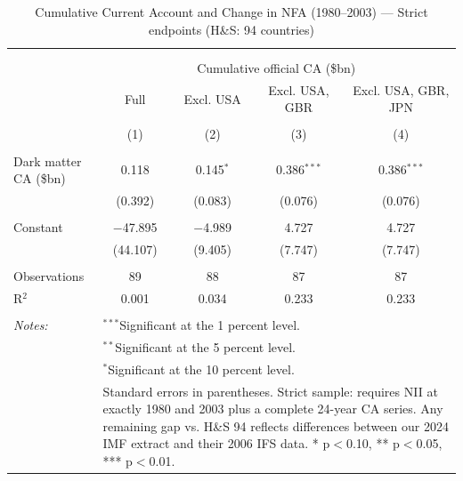 \documentclass[11pt]{article}
\begin{document}
\small
\setcounter{table}{0}

\begin{table}[!htbp] \centering 
  \caption{Cumulative Current Account and Change in NFA (1980--2003) --- Strict endpoints (H\&S: 94 countries)} 
  \label{tab:table1_corrected} 
\begin{tabular}{@{\extracolsep{5pt}}lcccc} 
\\[-1.8ex]\hline 
\hline \\[-1.8ex] 
\\[-1.8ex] & \multicolumn{4}{c}{Cumulative official CA (\$bn)} \\ 
 & Full & Excl. USA & Excl. USA, GBR & Excl. USA, GBR, JPN \\ 
\\[-1.8ex] & (1) & (2) & (3) & (4)\\ 
\hline \\[-1.8ex] 
 Dark matter CA (\$bn) & 0.118 & 0.145$^{*}$ & 0.386$^{***}$ & 0.386$^{***}$ \\ 
  & (0.392) & (0.083) & (0.076) & (0.076) \\ 
  & & & & \\ 
 Constant & $-$47.895 & $-$4.989 & 4.727 & 4.727 \\ 
  & (44.107) & (9.405) & (7.747) & (7.747) \\ 
  & & & & \\ 
Observations & 89 & 88 & 87 & 87 \\ 
R$^{2}$ & 0.001 & 0.034 & 0.233 & 0.233 \\ 
\hline \\[-1.8ex] 
\textit{Notes:} & \multicolumn{4}{l}{$^{***}$Significant at the 1 percent level.} \\ 
 & \multicolumn{4}{l}{$^{**}$Significant at the 5 percent level.} \\ 
 & \multicolumn{4}{l}{$^{*}$Significant at the 10 percent level.} \\ 
 & \multicolumn{4}{l}{Standard errors in parentheses. Strict sample: requires NII at exactly 1980 and 2003 plus a complete 24-year CA series. Any remaining gap vs. H\&S 94 reflects differences between our 2024 IMF extract and their 2006 IFS data. * p$<$0.10, ** p$<$0.05, *** p$<$0.01.} \\ 
\end{tabular} 
\end{table} 
\end{document}
